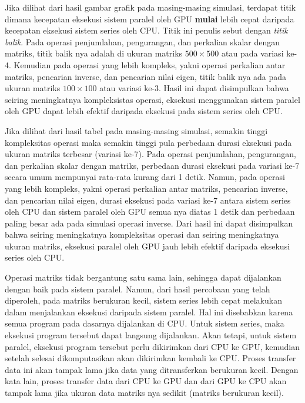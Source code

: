 Jika dilihat dari hasil gambar grafik pada masing-masing simulasi, terdapat titik dimana kecepatan eksekusi sistem paralel oleh GPU \textbf{mulai} lebih cepat daripada kecepatan eksekusi sistem series oleh CPU. Titik ini penulis sebut dengan \emph{titik balik}. Pada operasi penjumlahan, pengurangan, dan perkalian skalar dengan matriks, titik balik nya adalah di ukuran matriks $500 \times 500$ atau pada variasi ke-4. Kemudian pada operasi yang lebih kompleks, yakni operasi perkalian antar matriks, pencarian inverse, dan pencarian nilai eigen, titik balik nya ada pada ukuran matriks $100 \times 100$ atau variasi ke-3. Hasil ini dapat disimpulkan bahwa seiring meningkatnya kompleksistas operasi, eksekusi menggunakan sistem paralel oleh GPU dapat lebih efektif daripada eksekusi pada sistem series oleh CPU.

Jika dilihat dari hasil tabel pada masing-masing simulasi, semakin tinggi kompleksitas operasi maka semakin tinggi pula perbedaan durasi eksekusi pada ukuran matriks terbesar (variasi ke-7). Pada operasi penjumlahan, pengurangan, dan perkalian skalar dengan matriks, perbedaan durasi eksekusi pada variasi ke-7 secara umum mempunyai rata-rata kurang dari 1 detik. Namun, pada operasi yang lebih kompleks, yakni operasi perkalian antar matriks, pencarian inverse, dan pencarian nilai eigen, durasi eksekusi pada variasi ke-7 antara sistem series oleh CPU dan sistem paralel oleh GPU semua nya diatas 1 detik dan perbedaan paling besar ada pada simulasi operasi inverse. Dari hasil ini dapat disimpulkan bahwa seiring meningkatnya kompleksitas operasi dan seiring meningkatnya ukuran matriks, eksekusi paralel oleh GPU jauh lebih efektif daripada eksekusi series oleh CPU.

Operasi matriks tidak bergantung satu sama lain, sehingga dapat dijalankan dengan baik pada sistem paralel. Namun, dari hasil percobaan yang telah diperoleh, pada matriks berukuran kecil, sistem series lebih cepat melakukan dalam menjalankan eksekusi daripada sistem paralel. Hal ini disebabkan karena semua program pada dasarnya dijalankan di CPU. Untuk sistem series, maka eksekusi program tersebut dapat langsung dijalankan. Akan tetapi, untuk sistem paralel, eksekusi program tersebut perlu dikirimkan dari CPU ke GPU, kemudian setelah selesai dikomputasikan akan dikirimkan kembali ke CPU. Proses transfer data ini akan tampak lama jika data yang ditransferkan berukuran kecil. Dengan kata lain, proses transfer data dari CPU ke GPU dan dari GPU ke CPU akan tampak lama jika ukuran data matriks nya sedikit (matriks berukuran kecil).

